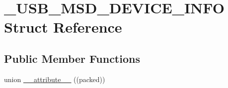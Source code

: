\hypertarget{struct___u_s_b___m_s_d___d_e_v_i_c_e___i_n_f_o}{}\section{\+\_\+\+U\+S\+B\+\_\+\+M\+S\+D\+\_\+\+D\+E\+V\+I\+C\+E\+\_\+\+I\+N\+F\+O Struct Reference}
\label{struct___u_s_b___m_s_d___d_e_v_i_c_e___i_n_f_o}
\subsection*{Public Member Functions}
\begin{DoxyCompactItemize}
\item 
union \hyperlink{struct___u_s_b___m_s_d___d_e_v_i_c_e___i_n_f_o_a89111fa811fe523355c0efcf371c52f6}{\+\_\+\+\_\+attribute\+\_\+\+\_\+} ((packed))
\end{DoxyCompactItemize}

